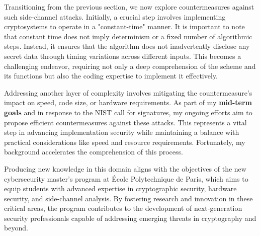\documentclass[11pt, a4paper]{article}
\begin{document}
Transitioning from the previous section, we now explore countermeasures against such side-channel attacks. Initially, a crucial step involves implementing cryptosystems to operate in a "constant-time" manner. It is important to note that constant time does not imply determinism or a fixed number of algorithmic steps. Instead, it ensures that the algorithm does not inadvertently disclose any secret data through timing variations across different inputs. This becomes a challenging endeavor, requiring not only a deep comprehension of the scheme and its functions but also the coding expertise to implement it effectively.

Addressing another layer of complexity involves mitigating the countermeasure's impact on speed, code size, or hardware requirements. As part of my \textbf{mid-term goals} and in response to the NIST call for signatures, my ongoing efforts aim to propose efficient countermeasures against these attacks. This represents a vital step in advancing implementation security while maintaining a balance with practical considerations like speed and resource requirements. Fortunately, my background accelerates the comprehension of this process.





Producing new knowledge in this domain aligns with the objectives of the new cybersecurity 
master's program at École Polytechnique de Paris, which aims to equip students with advanced 
expertise in cryptographic security, hardware security, and side-channel analysis. By fostering 
research and innovation in these critical areas, the program contributes to the development of 
next-generation security professionals capable of addressing emerging threats in cryptography 
and beyond.
\end{document}

